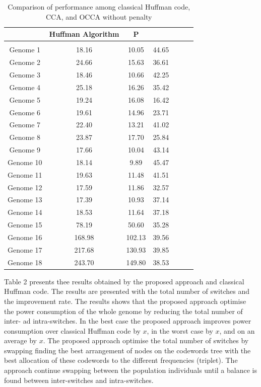 \documentclass[preprint,12pt]{elsarticle}
\begin{document}
\begin{table}[h]
\renewcommand{\arraystretch}{1.1}
\small
\label{table4}
\caption{Comparison of performance among classical Huffman code, CCA, and OCCA without penalty}

\begin{tabular}{c  c c  c c  c c}
\hline
 & Huffman Algorithm & P \\\hline
\\\hline
Genome 1& 18.16 & 10.05 & 44.65 \\\hline
Genome 2& 24.66 &  15.63 & 36.61 \\\hline
Genome 3&18.46 &  10.66&  42.25\\\hline
Genome 4&25.18&16.26& 35.42\\\hline
Genome 5& 19.24& 16.08 &16.42 \\\hline
Genome 6& 19.61&14.96&23.71\\\hline
Genome 7& 22.40 &13.21&41.02\\\hline
Genome 8&23.87 & 17.70 &25.84\\\hline
Genome 9&17.66 &10.04&43.14\\\hline
Genome 10& 18.14 &9.89& 45.47 \\\hline
Genome 11&19.63&11.48&41.51 \\\hline
Genome 12& 17.59&11.86&32.57 \\\hline
Genome 13& 17.39&10.93&37.14\\\hline
Genome 14&18.53 &11.64&37.18 \\\hline
Genome 15&78.19 &50.60&35.28 \\\hline
Genome 16& 168.98& 102.13&39.56 \\\hline
Genome 17&217.68 &130.93 & 39.85 \\\hline
Genome 18& 243.70& 149.80&38.53 \\\hline
\end{tabular}
\end{table}
Table 2 presents thee results obtained by the proposed approach and classical Huffman code. The results are presented with the total number of switches and the improvement rate. The results shows that the proposed approach optimise the power consumption of the whole genome by reducing the total number of inter- ad intra-switches. In the best case the proposed approach improves power consumption over classical Huffman code by $x$, in the worst case by $x$, and on an average by $x$. The proposed approach optimise the total number of switches by swapping finding the best arrangement of nodes on the codewords tree with the best allocation of these codewords to the different frequencies (triplet). The approach continue swapping between the population individuals until a balance is found between inter-switches and intra-switches.
 
\end{document}
